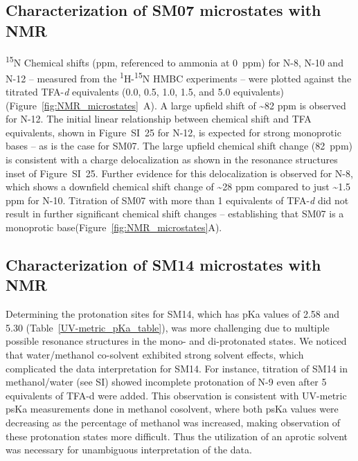 \documentclass[9pt,lineno]{elife}
\begin{document}
\subsection{Characterization of SM07 microstates with NMR}

\textsuperscript{15}N Chemical shifts (ppm, referenced to ammonia at 0~ppm) for N-8, N-10 and N-12 – measured from the \textsuperscript{1}H-\textsuperscript{15}N HMBC experiments – were plotted against the titrated TFA-\textit{d} equivalents (0.0, 0.5, 1.0, 1.5, and 5.0 equivalents)(Figure~\ref{fig:NMR_microstates}~A). A large upfield shift of \textasciitilde82 ppm is observed for N-12. The initial linear relationship between chemical shift and TFA equivalents, shown in Figure~SI~25 for N-12, is expected for strong monoprotic bases – as is the case for SM07. The large upfield chemical shift change (82~ppm) is consistent with a charge delocalization as shown in the resonance structures inset of Figure~SI~25. Further evidence for this delocalization is observed for N-8, which shows a downfield chemical shift change of \textasciitilde28 ppm compared to just \textasciitilde1.5 ppm for N-10. Titration of SM07 with more than 1 equivalents of TFA-\textit{d} did not result in further significant chemical shift changes – establishing that SM07 is a monoprotic base(Figure~\ref{fig:NMR_microstates}A).

\subsection{Characterization of SM14 microstates with NMR}

Determining the protonation sites for SM14, which has pKa values of 2.58 and 5.30 (Table~\ref{UV-metric_pKa_table}), was more challenging due to multiple possible resonance structures in the mono- and di-protonated states. We noticed that water/methanol co-solvent exhibited strong solvent effects, which complicated the data interpretation for SM14. For instance, titration of SM14 in methanol/water (see SI) showed incomplete protonation of N-9 even after 5 equivalents of TFA-d were added. This observation is consistent with UV-metric psKa measurements done in methanol cosolvent, where both psKa values were decreasing as the percentage of methanol was increased, making observation of these protonation states more difficult. Thus the utilization of an aprotic solvent was necessary for unambiguous interpretation of the data.
\end{document}
